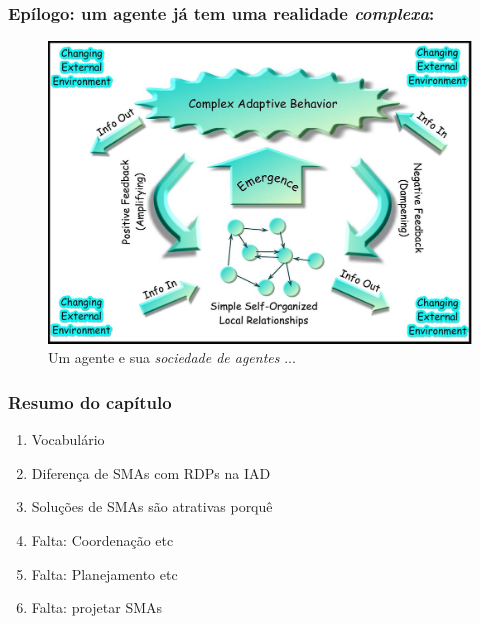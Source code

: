 \begin{frame} %

  \frametitle{Epílogo: um agente já tem uma realidade \textit{complexa}:}
        
\begin{figure}[!ht]
\centering
\includegraphics[height =.6\textheight,width=.7\textwidth]{figuras/complex-adaptive-system.jpg}
\caption{Um agente e sua \textit{sociedade de agentes} ...}
\end{figure}
    
\end{frame}








\begin{frame} %

 \frametitle{Resumo do capítulo}

\begin{enumerate}
  \item Vocabulário
 \item Diferença de SMAs com RDPs  na IAD
  \item Soluções de SMAs são atrativas porquê
    
    \item Falta: Coordenação etc
        \item Falta: Planejamento etc
     \item Falta: projetar  SMAs     
  
\end{enumerate}


\end{frame}
